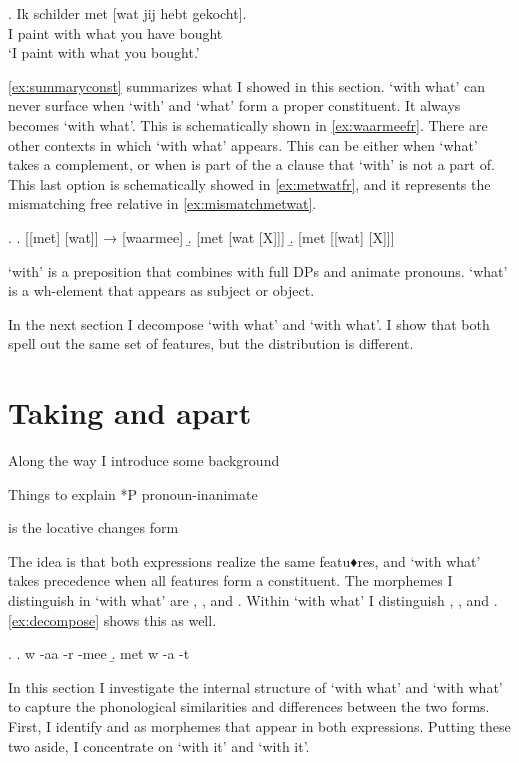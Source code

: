 \documentclass[12pt]{article}
\begin{document}
\exg. Ik schilder met [wat jij hebt gekocht].\\
 I paint with what you have bought\\
 `I paint with what you bought.'\label{ex:mismatchmetwat}

\ref{ex:summaryconst} summarizes what I showed in this section.  `with what' can never surface when  `with' and  `what' form a proper constituent. It always becomes  `with what'. This is schematically shown in \ref{ex:waarmeefr}.
There are other contexts in which  `with what' appears. This can be either when  `what' takes a complement, or when  is part of the a clause that  `with' is not a part of. This last option is schematically showed in \ref{ex:metwatfr}, and it represents the mismatching free relative in \ref{ex:mismatchmetwat}.

\ex.\label{ex:summaryconst}
\a. [[met] [wat]] → [waarmee]\label{ex:waarmeefr}
\b. [met [wat [X]]]
\b. [met [[wat] [X]]]\label{ex:metwatfr}

 `with' is a preposition that combines with full DPs and animate pronouns.  `what' is a wh-element that appears as subject or object.

In the next section I decompose  `with what' and  `with what'. I show that both spell out the same set of features, but the distribution is different.



\section{Taking  and  apart}

Along the way I introduce some background

Things to explain
*P pronoun-inanimate

 is the locative
 changes form

 The idea is that both expressions realize the same featu♦res, and  `with what' takes precedence when all features form a constituent. The morphemes I distinguish in  `with what' are , ,  and . Within  `with what' I distinguish , ,  and . \ref{ex:decompose} shows this as well.

\ex.\label{ex:decompose}
\a. w -aa -r -mee
\b. met w -a -t

In this section I investigate the internal structure of  `with what' and  `with what' to capture the phonological similarities and differences between the two forms. First, I identify  and  as morphemes that appear in both expressions. Putting these two aside, I concentrate on  `with it' and  `with it'.
\end{document}
